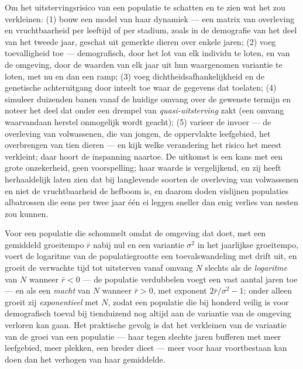 \begin{method}\label{met:b3:conservation-biology:pva}
Om het uitstervingsrisico van een populatie te schatten en te zien wat
het zou verkleinen: (1) bouw een model van haar dynamiek --- een matrix
van overleving en vruchtbaarheid per leeftijd of per stadium, zoals in
de demografie van het deel van het tweede jaar, geschat uit gemerkte
dieren over enkele jaren; (2) voeg toevalligheid toe --- demografisch,
door het lot van elk individu te loten, en van de omgeving, door de
waarden van elk jaar uit hun waargenomen variantie te loten, met nu en
dan een ramp; (3) voeg dichtheidsafhankelijkheid en de genetische
achteruitgang door inteelt toe waar de gegevens dat toelaten;
(4) simuleer duizenden banen vanaf de huidige omvang over de gewenste
termijn en noteer het deel dat onder een drempel van
\emph{quasi-uitsterving} zakt (een omvang waarvandaan herstel onmogelijk
wordt geacht); (5) varieer de invoer --- de overleving van volwassenen,
die van jongen, de oppervlakte leefgebied, het overbrengen van tien
dieren --- en kijk welke verandering het risico het meest verkleint;
daar hoort de inspanning naartoe. De uitkomst is een kans met een grote
onzekerheid, geen voorspelling; haar waarde is vergelijkend, en zij
heeft herhaaldelijk laten zien dat bij langlevende soorten de
overleving van volwassenen en niet de vruchtbaarheid de hefboom is, en
daarom doden vislijnen populaties albatrossen die eens per twee jaar
één ei leggen sneller dan enig verlies van nesten zou kunnen.
\end{method}

\begin{proposition}\label{prop:b3:conservation-biology:time}
Voor een populatie die schommelt omdat de omgeving dat doet, met een
gemiddeld groeitempo $\bar r$ nabij nul en een variantie $\sigma^{2}$
in het jaarlijkse groeitempo, voert de logaritme van de
populatiegrootte een toevalswandeling met drift uit, en groeit de
verwachte tijd tot uitsterven vanaf omvang $N$ slechts als de
\emph{logaritme} van $N$ wanneer $\bar r < 0$ --- de populatie
verdubbelen voegt een vast aantal jaren toe --- en als een \emph{macht}
van $N$ wanneer $\bar r > 0$, met exponent $2\bar r/\sigma^{2} - 1$;
onder  alleen groeit zij
\emph{exponentieel} met $N$, zodat een populatie die bij honderd veilig
is voor demografisch toeval bij tienduizend nog altijd aan de variantie
van de omgeving verloren kan gaan. Het praktische gevolg is dat het
verkleinen van de variantie van de groei van een populatie --- haar
tegen slechte jaren bufferen met meer leefgebied, meer plekken, een
breder dieet --- meer voor haar voortbestaan kan doen dan het verhogen
van haar gemiddelde.
\end{proposition}
\admitted

